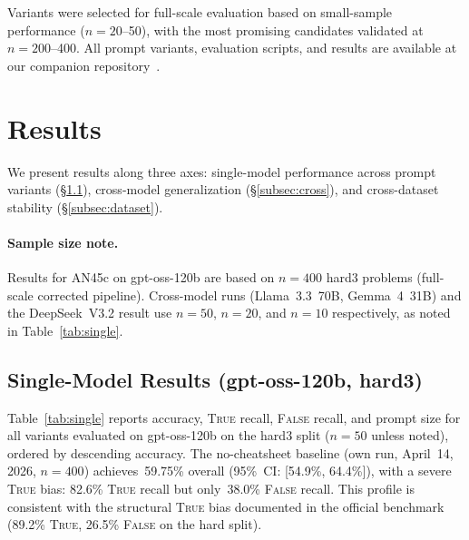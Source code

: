 \documentclass[11pt]{article}
\begin{document}
Variants were selected for full-scale evaluation based on
small-sample performance ($n=20$--50), with the most promising
candidates validated at $n=200$--400. All prompt variants, evaluation
scripts, and results are available at our companion
repository~\citep{cazares2026sair}.

\section{Results}
\label{sec:results}

We present results along three axes: single-model performance across
prompt variants (\S\ref{subsec:single}), cross-model generalization
(\S\ref{subsec:cross}), and cross-dataset stability
(\S\ref{subsec:dataset}).

\paragraph{Sample size note.}
Results for AN45c on gpt-oss-120b are based on $n=400$ hard3
problems (full-scale corrected pipeline). Cross-model runs
(Llama~3.3~70B, Gemma~4~31B) and the DeepSeek~V3.2 result
use $n=50$, $n=20$, and $n=10$ respectively, as noted in
Table~\ref{tab:single}.

\subsection{Single-Model Results (gpt-oss-120b, hard3)}
\label{subsec:single}

Table~\ref{tab:single} reports accuracy, \textsc{True} recall,
\textsc{False} recall, and prompt size for all variants evaluated on
gpt-oss-120b on the hard3 split ($n=50$ unless noted), ordered by
descending accuracy. The no-cheatsheet baseline (own run, April~14,
2026, $n=400$) achieves~59.75\% overall (95\%~CI: [54.9\%, 64.4\%]),
with a severe \textsc{True} bias: 82.6\% \textsc{True} recall but
only~38.0\% \textsc{False} recall. This profile is consistent with
the structural \textsc{True} bias documented in the official benchmark
(89.2\% \textsc{True}, 26.5\% \textsc{False} on the hard split).
\end{document}
